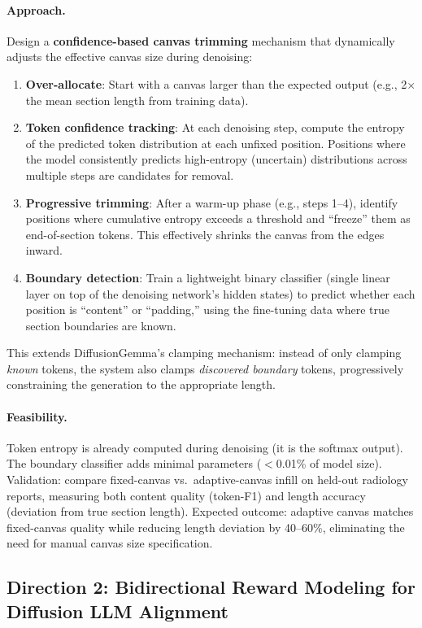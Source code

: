 \documentclass[11pt,a4paper]{article}
\begin{document}
\paragraph{Approach.} Design a \textbf{confidence-based canvas trimming} mechanism that dynamically adjusts the effective canvas size during denoising:
\begin{enumerate}
\item \textbf{Over-allocate}: Start with a canvas larger than the expected output (e.g., 2$\times$ the mean section length from training data).
\item \textbf{Token confidence tracking}: At each denoising step, compute the entropy of the predicted token distribution at each unfixed position. Positions where the model consistently predicts high-entropy (uncertain) distributions across multiple steps are candidates for removal.
\item \textbf{Progressive trimming}: After a warm-up phase (e.g., steps 1--4), identify positions where cumulative entropy exceeds a threshold and ``freeze'' them as end-of-section tokens. This effectively shrinks the canvas from the edges inward.
\item \textbf{Boundary detection}: Train a lightweight binary classifier (single linear layer on top of the denoising network's hidden states) to predict whether each position is ``content'' or ``padding,'' using the fine-tuning data where true section boundaries are known.
\end{enumerate}
This extends DiffusionGemma's clamping mechanism: instead of only clamping \emph{known} tokens, the system also clamps \emph{discovered boundary} tokens, progressively constraining the generation to the appropriate length.

\paragraph{Feasibility.} Token entropy is already computed during denoising (it is the softmax output). The boundary classifier adds minimal parameters ($<$0.01\% of model size). Validation: compare fixed-canvas vs.\ adaptive-canvas infill on held-out radiology reports, measuring both content quality (token-F1) and length accuracy (deviation from true section length). Expected outcome: adaptive canvas matches fixed-canvas quality while reducing length deviation by 40--60\%, eliminating the need for manual canvas size specification.

\subsection{Direction 2: Bidirectional Reward Modeling for Diffusion LLM Alignment}
\end{document}
